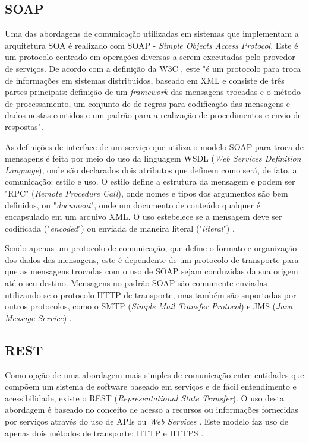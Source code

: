 \subsection{SOAP}
Uma das abordagens de comunicação utilizadas em sistemas que implementam a arquitetura SOA é realizado com SOAP - \textit{Simple Objects Access Protocol}. Este é um protocolo centrado em operações diversas a serem executadas pelo provedor de serviços. De acordo com a definição da W3C \cite{box_simple_2000}, este "é um protocolo para troca de informações em sistemas distribuídos, baseado em XML e consiste de três partes principais: definição de um \textit{framework} das mensagens trocadas e o método de processamento, um conjunto de de regras para codificação das mensagens e dados nestas contidos e um padrão para a realização de procedimentos e envio de respostas".

As definições de interface de um serviço que utiliza o modelo SOAP para troca de mensagens é feita por meio do uso da linguagem WSDL (\textit{Web Services Definition Language}), onde são declarados dois atributos que definem como será, de fato, a comunicação: estilo e uso. O estilo define a estrutura da mensagem e podem ser "RPC" (\textit{Remote Procedure Call}), onde nomes e tipos dos argumentos são bem definidos, ou "\textit{document}", onde um documento de conteúdo qualquer é encapsulado em um arquivo XML. O uso estebelece se a mensagem deve ser codificada ("\textit{encoded}") ou enviada de maneira literal ("\textit{literal}") \cite{Bianco2007}.

Sendo apenas um protocolo de comunicação, que define o formato e organização dos dados das mensagens, este é dependente de um protocolo de transporte para que as mensagens trocadas com o uso de SOAP sejam conduzidas da sua origem até o seu destino. Mensagens no padrão SOAP são comumente enviadas utilizando-se o protocolo HTTP de transporte, mas também são suportadas por outros protocolos, como o SMTP (\textit{Simple Mail Transfer Protocol}) e JMS (\textit{Java Message Service}) \cite{mueller_understanding_2013}.

\subsection{REST}
Como opção de uma abordagem mais simples de comunicação entre entidades que compõem um sistema de software baseado em serviços e de fácil entendimento e acessibilidade, existe o REST (\textit{Representational State Transfer}). O uso desta abordagem é baseado no conceito de acesso a recursos ou informações fornecidas por serviços através do uso de APIs ou \textit{Web Services} \cite{Bianco2007}. Este modelo faz uso de apenas dois métodos de transporte: HTTP e HTTPS \cite{rozlog_restesoap_2013}.

